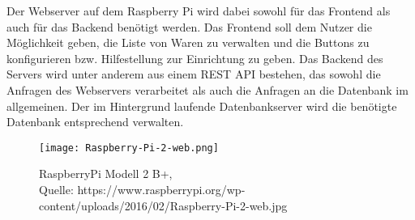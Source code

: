 Der Webserver auf dem Raspberry Pi wird dabei sowohl für das Frontend als auch für das Backend benötigt werden. Das Frontend soll dem Nutzer die Möglichkeit geben, die Liste von Waren zu verwalten und die Buttons zu konfigurieren bzw. Hilfestellung zur Einrichtung zu geben. Das Backend des Servers wird unter anderem aus einem \ac{REST} \ac{API} bestehen, das sowohl die Anfragen des Webservers verarbeitet als auch die Anfragen an die Datenbank im allgemeinen. 
Der im Hintergrund laufende Datenbankserver wird die benötigte Datenbank entsprechend verwalten. 

\begin{figure}[!htb]
	\centering
	\texttt{[image: Raspberry-Pi-2-web.png]}
	\caption[RaspberryPi Modell 2 B]{RaspberryPi Modell 2 B+,\\ Quelle: https://www.raspberrypi.org/wp-content/uploads/2016/02/Raspberry-Pi-2-web.jpg}
\end{figure}